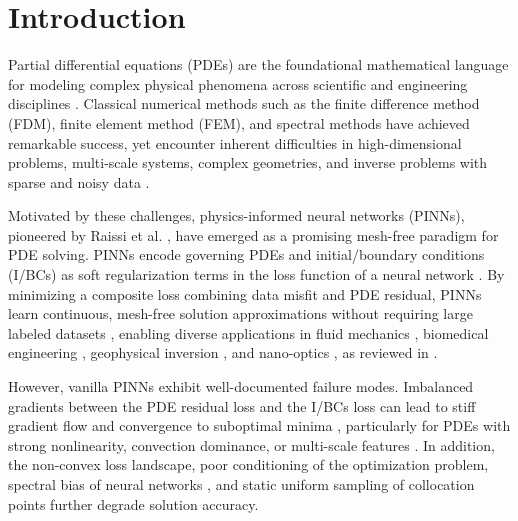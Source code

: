 \documentclass{article}
\theoremstyle{plain}
\theoremstyle{definition}
\theoremstyle{remark}
\begin{document}
	\section{Introduction}
	
	Partial differential equations (PDEs) are the foundational mathematical language for modeling complex physical phenomena across scientific and engineering disciplines \cite{PINN_Raissi1,Karniadakis2}. Classical numerical methods such as the finite difference method (FDM), finite element method (FEM), and spectral methods \cite{Zienkiewicz3,Fornberg4} have achieved remarkable success, yet encounter inherent difficulties in high-dimensional problems, multi-scale systems, complex geometries, and inverse problems with sparse and noisy data \cite{Han5,Sirignano6}.
	
	Motivated by these challenges, physics-informed neural networks (PINNs), pioneered by Raissi et al. \cite{PINN_Raissi1}, have emerged as a promising mesh-free paradigm for PDE solving. PINNs encode governing PDEs and initial/boundary conditions (I/BCs) as soft regularization terms in the loss function of a neural network \cite{Lagaris7,Dissanayake8}. By minimizing a composite loss combining data misfit and PDE residual, PINNs learn continuous, mesh-free solution approximations without requiring large labeled datasets \cite{Yang9,Zhang10}, enabling diverse applications in fluid mechanics \cite{Raissi11}, biomedical engineering \cite{Sahli12}, geophysical inversion \cite{Ishitsuka13}, and nano-optics \cite{Chen14}, as reviewed in \cite{Karniadakis2,Cuomo15}.
	
	However, vanilla PINNs exhibit well-documented failure modes. Imbalanced gradients between the PDE residual loss and the I/BCs loss can lead to stiff gradient flow and convergence to suboptimal minima \cite{Wang16,Wang17}, particularly for PDEs with strong nonlinearity, convection dominance, or multi-scale features \cite{Krishnapriyan18,Fuks19}. In addition, the non-convex loss landscape, poor conditioning of the optimization problem, spectral bias of neural networks \cite{Rahaman21,Xu22}, and static uniform sampling of collocation points \cite{Daw23,Wu24} further degrade solution accuracy.
	
\end{document}

